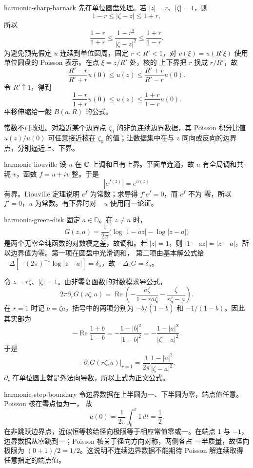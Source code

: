 \begin{solution}{harmonic-sharp-harnack}
先在单位圆盘处理。若 $|z|=r$、$|\zeta|=1$，则
\[
 1-r\le|\zeta-z|\le1+r,
\]
所以
\[
 \frac{1-r}{1+r}\le
 \frac{1-r^2}{|\zeta-z|^2}
 \le\frac{1+r}{1-r}.
\]
为避免预先假定 $u$ 连续到单位圆周，固定 $r<R'<1$，对
$v(\xi)=u(R'\xi)$ 使用单位圆盘的 Poisson 表示。在点 $\xi=z/R'$ 处，核的
上下界把 $r$ 换成 $r/R'$，故
\[
 \frac{R'-r}{R'+r}u(0)
 \le u(z)\le
 \frac{R'+r}{R'-r}u(0).
\]
令 $R'\uparrow1$，得到
\[
 \frac{1-r}{1+r}u(0)\le u(z)\le\frac{1+r}{1-r}u(0).
\]
平移伸缩给一般 $B(a,R)$ 的公式。

常数不可改进。对趋近某个边界点 $\zeta_0$ 的非负连续边界数据，其 Poisson
积分比值 $u(z)/u(0)$ 可任意接近核在 $\zeta_0$ 的值；让数据集中在与 $z$
同向或反向的边界点，分别逼近上、下界。
\end{solution}

\begin{solution}{harmonic-liouville}
设 $u$ 在 $\mathbb{C}$ 上调和且有上界。平面单连通，故 $u$ 有全局调和共轭
$v$，函数 $f=u+iv$ 整。于是
\[
 |e^{f(z)}|=e^{u(z)}
\]
有界。Liouville 定理说明 $e^f$ 为常数；求导得 $f'e^f=0$，而 $e^f$ 不为
零，所以 $f'=0$，$u$ 为常数。有下界时对 $-u$ 使用同一论证。
\end{solution}

\begin{solution}{harmonic-green-disk}
固定 $a\in\mathbb D$。在 $z\ne a$ 时，
\[
 G(z,a)=\frac1{2\pi}\bigl(\log|1-\overline a z|-\log|z-a|\bigr)
\]
是两个无零全纯函数的对数模之差，故调和。若 $|z|=1$，则
$|1-\overline a z|=|z-a|$，所以边界值为零。第一项在圆盘中光滑调和，
第二项由基本解公式给
$-\Delta[-(2\pi)^{-1}\log|z-a|]=\delta_a$，故
$-\Delta_zG=\delta_a$。

令 $z=r\zeta$、$|\zeta|=1$。由非零复函数的对数模求导公式，
\[
 2\pi\partial_rG(r\zeta,a)
 =\operatorname{Re}\left(
 -\frac{\overline a\zeta}{1-r\overline a\zeta}
 -\frac{\zeta}{r\zeta-a}\right).
\]
在 $r=1$ 时记 $b=\overline\zeta a$，括号中的两项分别为
$-\overline b/(1-\overline b)$ 和 $-1/(1-b)$。因此其实部为
\[
 -\operatorname{Re}\frac{1+b}{1-b}
 =-\frac{1-|b|^2}{|1-b|^2}
 =-\frac{1-|a|^2}{|\zeta-a|^2}.
\]
于是
\[
 -\partial_rG(r\zeta,a)|_{r=1}
 =\frac1{2\pi}\frac{1-|a|^2}{|\zeta-a|^2}.
\]
$\partial_r$ 在单位圆上就是外法向导数，所以上式为正文公式。
\end{solution}

\begin{solution}{harmonic-step-boundary}
令边界数据在上半圆为一、下半圆为零，端点值任意。Poisson 核在零点恒为一，
故
\[
 u(0)=\frac1{2\pi}\int_0^\pi1\,dt=\frac12.
\]
在非跳跃边界点，近似恒等核给径向极限等于相应常值零或一。在端点
$1$ 与 $-1$，边界数据从零跳到一；Poisson 核关于径向方向对称，两侧各占
一半质量，故径向极限为 $(0+1)/2=1/2$。这说明不连续边界数据不能期待
Poisson 解连续取得任意指定的端点值。
\end{solution}
